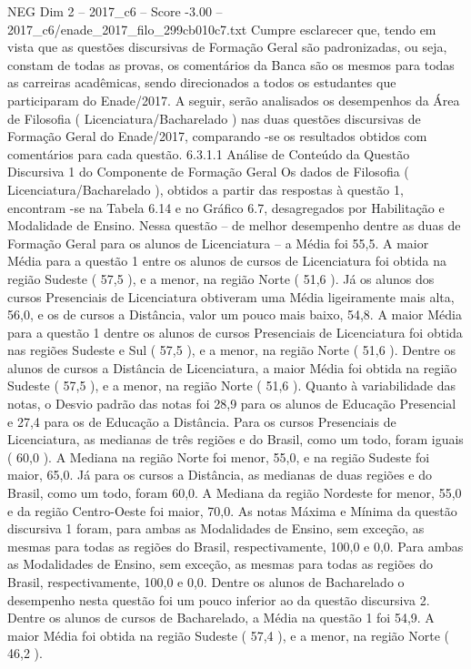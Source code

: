 \begin{textsample}{NEG Dim 2 – 2017\_c6 – Score -3.00 – 2017\_c6/enade\_2017\_filo\_299cb010c7.txt}
Cumpre esclarecer que, tendo em vista que as questões discursivas de Formação Geral são padronizadas, ou seja, constam de todas as provas, os comentários da Banca são os mesmos para todas as carreiras acadêmicas, sendo direcionados a todos os estudantes que participaram do Enade/2017.
A seguir, serão analisados os desempenhos da Área de Filosofia ( Licenciatura/Bacharelado ) nas duas questões discursivas de Formação Geral do Enade/2017, comparando -se os resultados obtidos com comentários para cada questão. 6.3.1.1 Análise de Conteúdo da Questão Discursiva 1 do Componente de Formação Geral Os dados de Filosofia ( Licenciatura/Bacharelado ), obtidos a partir das respostas à questão 1, encontram -se na Tabela 6.14 e no Gráfico 6.7, desagregados por Habilitação e Modalidade de Ensino.
Nessa questão – de melhor desempenho dentre as duas de Formação Geral para os alunos de Licenciatura – a Média foi 55,5.
A maior Média para a questão 1 entre os alunos de cursos de Licenciatura foi obtida na região Sudeste ( 57,5 ), e a menor, na região Norte ( 51,6 ).
Já os alunos dos cursos Presenciais de Licenciatura obtiveram uma Média ligeiramente mais alta, 56,0, e os de cursos a Distância, valor um pouco mais baixo, 54,8.
A maior Média para a questão 1 dentre os alunos de cursos Presenciais de Licenciatura foi obtida nas regiões Sudeste e Sul ( 57,5 ), e a menor, na região Norte ( 51,6 ).
Dentre os alunos de cursos a Distância de Licenciatura, a maior Média foi obtida na região Sudeste ( 57,5 ), e a menor, na região Norte ( 51,6 ).
Quanto à variabilidade das notas, o Desvio padrão das notas foi 28,9 para os alunos de Educação Presencial e 27,4 para os de Educação a Distância.
Para os cursos Presenciais de Licenciatura, as medianas de três regiões e do Brasil, como um todo, foram iguais ( 60,0 ).
A Mediana na região Norte foi menor, 55,0, e na região Sudeste foi maior, 65,0.
Já para os cursos a Distância, as medianas de duas regiões e do Brasil, como um todo, foram 60,0.
A Mediana da região Nordeste for menor, 55,0 e da região Centro-Oeste foi maior, 70,0.
As notas Máxima e Mínima da questão discursiva 1 foram, para ambas as Modalidades de Ensino, sem exceção, as mesmas para todas as regiões do Brasil, respectivamente, 100,0 e 0,0.
Para ambas as Modalidades de Ensino, sem exceção, as mesmas para todas as regiões do Brasil, respectivamente, 100,0 e 0,0.
Dentre os alunos de Bacharelado o desempenho nesta questão foi um pouco inferior ao da questão discursiva 2.
Dentre os alunos de cursos de Bacharelado, a Média na questão 1 foi 54,9.
A maior Média foi obtida na região Sudeste ( 57,4 ), e a menor, na região Norte ( 46,2 ).

\end{textsample}
